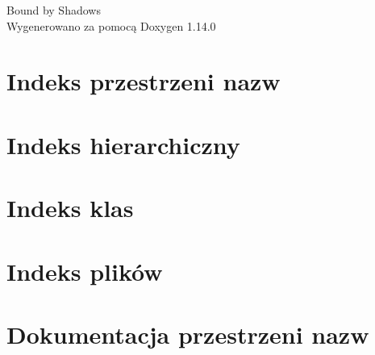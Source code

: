 \documentclass[twoside]{book}
\newcommand{\+}{\discretionary{\mbox{\scriptsize$\hookleftarrow$}}{}{}}
\newcommand{\clearemptydoublepage}{%
    \newpage{\pagestyle{empty}\cleardoublepage}%
  }
\begin{document}
  \raggedbottom
    \hypersetup{pageanchor=false,
                bookmarksnumbered=true,
                pdfencoding=unicode
               }
  \begin{titlepage}
  \vspace*{7cm}
  \begin{center}%
  {\Large Bound by Shadows}\\
  \vspace*{1cm}
  {\large Wygenerowano za pomocą Doxygen 1.14.0}\\
  \end{center}
  \end{titlepage}
  \clearemptydoublepage
  \tableofcontents
  \clearemptydoublepage
  \hypersetup{pageanchor=true}
\chapter{Indeks przestrzeni nazw}

\chapter{Indeks hierarchiczny}

\chapter{Indeks klas}

\chapter{Indeks plików}

\chapter{Dokumentacja przestrzeni nazw}

\end{document}
